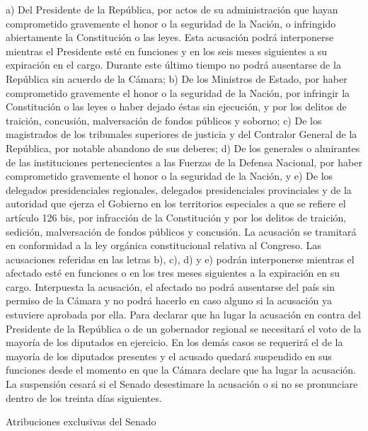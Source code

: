     a) Del Presidente de la República, por actos de su administración que hayan comprometido gravemente el honor o la seguridad de la Nación, o infringido abiertamente la Constitución o las leyes. Esta acusación podrá interponerse mientras el Presidente esté en funciones y en los seis meses siguientes a su expiración en el cargo. Durante este último tiempo no podrá ausentarse de la República sin acuerdo de la Cámara;
    b) De los Ministros de Estado, por haber comprometido gravemente el honor o la seguridad de la Nación, por infringir la Constitución o las leyes o haber dejado éstas sin ejecución, y por los delitos de traición, concusión, malversación de fondos públicos y soborno;
    c) De los magistrados de los tribunales superiores de justicia y del Contralor General de la República, por notable abandono de sus deberes;
    d) De los generales o almirantes de las instituciones pertenecientes a las Fuerzas de la Defensa Nacional, por haber comprometido gravemente el honor o la seguridad de la Nación, y
    e) De los delegados presidenciales regionales, delegados presidenciales provinciales y de la autoridad que ejerza el Gobierno en los territorios especiales a que se refiere el artículo 126 bis, por infracción de la Constitución y por los delitos de traición, sedición, malversación de fondos públicos y concusión.
    La acusación se tramitará en conformidad a la ley orgánica constitucional relativa al Congreso.
    Las acusaciones referidas en las letras b), c), d) y e) podrán interponerse mientras el afectado esté en funciones o en los tres meses siguientes a la expiración en su cargo. Interpuesta la acusación, el afectado no podrá ausentarse del país sin permiso de la Cámara y no podrá hacerlo en caso alguno si la acusación ya estuviere aprobada por ella.
    Para declarar que ha lugar la acusación en contra del Presidente de la República o de un gobernador regional se necesitará el voto de la mayoría de los diputados en ejercicio.
    En los demás casos se requerirá el de la mayoría de los diputados presentes y el acusado quedará suspendido en sus funciones desde el momento en que la Cámara declare que ha lugar la acusación. La suspensión cesará si el Senado desestimare la acusación o si no se pronunciare dentro de los treinta días siguientes.





    Atribuciones exclusivas del Senado



